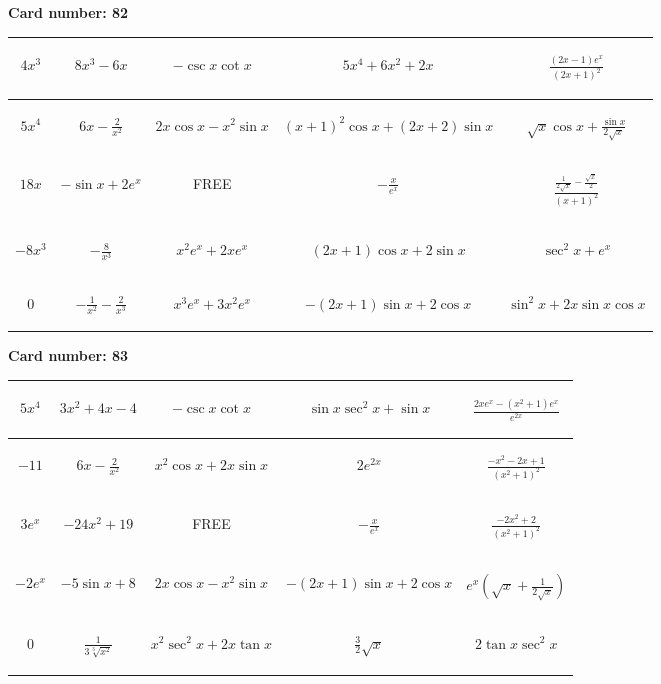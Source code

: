 \documentclass{article}
\newcommand{\entry}[1]{\begin{minipage}[t][2.75cm][t]{4cm} \vspace{1cm} \begin{center}#1\end{center} \end{minipage}}
\newcommand{\freespace}{\entry{FREE}}
\newcommand{\cardnumber}[1]{\noindent \textbf{Card number: #1} \bigskip}
\begin{document}
\pagebreak

\cardnumber{82}
\begin{center}
\begin{tabular}{|*{5}{c|}}
    \hline
    \entry{$4x^3$} & \entry{$8x^3 - 6x$} & \entry{$-\csc x \cot x$} & \entry{$5x^4 + 6x^2 + 2x$} & \entry{$\frac{(2x - 1) e^x}{(2x + 1)^2}$} \\ \hline
    \entry{$5x^4$} & \entry{$6x - \frac{2}{x^2}$} & \entry{$2x \cos x - x^2 \sin x$} & \entry{$(x + 1)^2 \cos x + (2x + 2) \sin x$} & \entry{$\sqrt{x} \cos x + \frac{\sin x}{2 \sqrt{x}}$} \\ \hline
    \entry{$18x$} & \entry{$-\sin x + 2e^x$} & \freespace & \entry{$-\frac{x}{e^x}$} & \entry{$\frac{\frac{1}{2 \sqrt{x}} - \frac{\sqrt{x}}{2}}{(x + 1)^2}$} \\ \hline
    \entry{$-8x^3$} & \entry{$-\frac{8}{x^3}$} & \entry{$x^2 e^x + 2x e^x$} & \entry{$(2x + 1) \cos x + 2 \sin x$} & \entry{$\sec^2 x + e^x$} \\ \hline
    \entry{$0$} & \entry{$-\frac{1}{x^2} - \frac{2}{x^3}$} & \entry{$x^3 e^x + 3x^2 e^x$} & \entry{$-(2x + 1) \sin x + 2 \cos x$} & \entry{$\sin^2 x + 2x \sin x \cos x$} \\ \hline
\end{tabular}
\end{center}

\pagebreak

\cardnumber{83}
\begin{center}
\begin{tabular}{|*{5}{c|}}
    \hline
    \entry{$5x^4$} & \entry{$3x^2 + 4x - 4$} & \entry{$-\csc x \cot x$} & \entry{$\sin x \sec^2 x + \sin x$} & \entry{$\frac{2x e^x - (x^2 + 1) e^x}{e^{2x}}$} \\ \hline
    \entry{$-11$} & \entry{$6x - \frac{2}{x^2}$} & \entry{$x^2 \cos x + 2x \sin x$} & \entry{$2e^{2x}$} & \entry{$\frac{-x^2 - 2x + 1}{(x^2 + 1)^2}$} \\ \hline
    \entry{$3e^x$} & \entry{$-24x^2 + 19$} & \freespace & \entry{$-\frac{x}{e^x}$} & \entry{$\frac{-2x^2 + 2}{(x^2 + 1)^2}$} \\ \hline
    \entry{$-2e^x$} & \entry{$-5 \sin x + 8$} & \entry{$2x \cos x - x^2 \sin x$} & \entry{$-(2x + 1) \sin x + 2 \cos x$} & \entry{$e^x \left(\sqrt{x} + \frac{1}{2\sqrt{x}}\right)$} \\ \hline
    \entry{$0$} & \entry{$\frac{1}{3\sqrt[3]{x^2}}$} & \entry{$x^2 \sec^2 x + 2x \tan x$} & \entry{$\frac{3}{2} \sqrt{x}$} & \entry{$2 \tan x \sec^2 x$} \\ \hline
\end{tabular}
\end{center}
\end{document}
